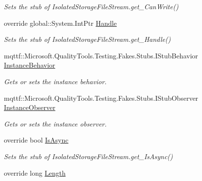 \begin{DoxyCompactItemize}
\begin{DoxyCompactList}\small\item\em Sets the stub of Isolated\-Storage\-File\-Stream.\-get\-\_\-\-Can\-Write()\end{DoxyCompactList}\item 
override global\-::\-System.\-Int\-Ptr \hyperlink{class_system_1_1_i_o_1_1_isolated_storage_1_1_fakes_1_1_stub_isolated_storage_file_stream_a6170871a28241e62f01ec7840cd61de8}{Handle}
\begin{DoxyCompactList}\small\item\em Sets the stub of Isolated\-Storage\-File\-Stream.\-get\-\_\-\-Handle()\end{DoxyCompactList}\item 
mqttf\-::\-Microsoft.\-Quality\-Tools.\-Testing.\-Fakes.\-Stubs.\-I\-Stub\-Behavior \hyperlink{class_system_1_1_i_o_1_1_isolated_storage_1_1_fakes_1_1_stub_isolated_storage_file_stream_a635571d9dcbefec007c18690c568de93}{Instance\-Behavior}
\begin{DoxyCompactList}\small\item\em Gets or sets the instance behavior.\end{DoxyCompactList}\item 
mqttf\-::\-Microsoft.\-Quality\-Tools.\-Testing.\-Fakes.\-Stubs.\-I\-Stub\-Observer \hyperlink{class_system_1_1_i_o_1_1_isolated_storage_1_1_fakes_1_1_stub_isolated_storage_file_stream_a19743c3cdf6bd1f9c2148ae0366d6693}{Instance\-Observer}
\begin{DoxyCompactList}\small\item\em Gets or sets the instance observer.\end{DoxyCompactList}\item 
override bool \hyperlink{class_system_1_1_i_o_1_1_isolated_storage_1_1_fakes_1_1_stub_isolated_storage_file_stream_abb9cdd24c5ccc59aa69c02f2cdb695dc}{Is\-Async}
\begin{DoxyCompactList}\small\item\em Sets the stub of Isolated\-Storage\-File\-Stream.\-get\-\_\-\-Is\-Async()\end{DoxyCompactList}\item 
override long \hyperlink{class_system_1_1_i_o_1_1_isolated_storage_1_1_fakes_1_1_stub_isolated_storage_file_stream_a73e668c26a3df79c13c1bad8c199c419}{Length}

\end{DoxyCompactItemize}
